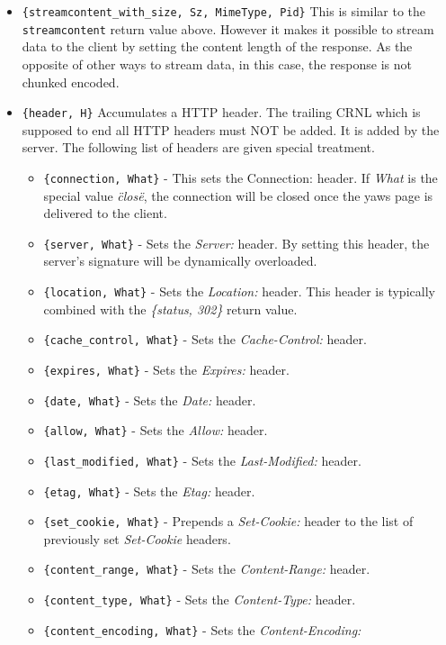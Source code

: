 \documentclass[11pt,oneside,english]{book}
\begin{document}
\begin{itemize}
\item \verb+{streamcontent_with_size, Sz, MimeType, Pid}+ This is
  similar to the \verb+streamcontent+ return value above. However it
  makes it possible to stream data to the client by setting the
  content length of the response. As the opposite of other ways to
  stream data, in this case, the response is not chunked encoded.


\item \verb+{header, H}+ Accumulates a HTTP header. The trailing CRNL which is
  supposed to end all HTTP headers must NOT be added. It is added by the server.
  The following list of headers are given special treatment.

  \begin{itemize}
    \item \verb+{connection, What}+ - This sets the Connection: header. If
      \textit{What} is the special value \textit{\"close\"}, the connection will
      be closed once the yaws page is delivered to the client.
    \item \verb+{server, What}+ - Sets the \textit{Server:} header. By setting
      this header, the server's signature will be dynamically overloaded.
    \item \verb+{location, What}+ - Sets the \textit{Location:} header. This
      header is typically combined with the \textit{\{status, 302\}} return
      value.
    \item \verb+{cache_control, What}+ - Sets the \textit{Cache-Control:}
      header.
    \item \verb+{expires, What}+ - Sets the \textit{Expires:} header.
    \item \verb+{date, What}+ - Sets the \textit{Date:} header.
    \item \verb+{allow, What}+ - Sets the \textit{Allow:} header.
    \item \verb+{last_modified, What}+ - Sets the \textit{Last-Modified:}
      header.
    \item \verb+{etag, What}+ - Sets the \textit{Etag:} header.
    \item \verb+{set_cookie, What}+ - Prepends a \textit{Set-Cookie:} header to
      the list of previously set \textit{Set-Cookie} headers.
    \item \verb+{content_range, What}+ - Sets the \textit{Content-Range:}
      header.
    \item \verb+{content_type, What}+ - Sets the \textit{Content-Type:} header.
    \item \verb+{content_encoding, What}+ - Sets the \textit{Content-Encoding:}

\end{itemize}
\end{itemize}
\end{document}

